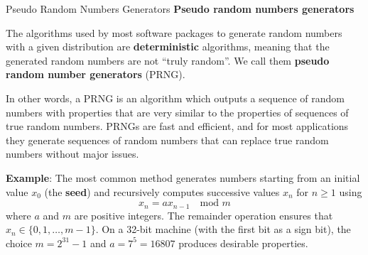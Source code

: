 \documentclass[8pt]{beamer}
\begin{document}
\begin{frame}{Pseudo Random Numbers Generators}
{\bf Pseudo random numbers generators}
\vspace{2mm}

The algorithms used by most software packages to generate random numbers with a given distribution are {\bf deterministic} algorithms, meaning that the generated random numbers are not ``truly random''. We call them {\bf pseudo random number generators} (PRNG).
\vspace{2mm}

In other words, a PRNG is an algorithm which outputs a sequence of random numbers with properties that are very similar to the properties of sequences of true random numbers. PRNGs are fast and efficient, and for most applications they generate sequences of random numbers that can replace true random numbers without major issues.  

\vspace{2mm}
\textbf{Example}: The most common method generates numbers starting from an initial value $x_0$ (the \textbf{seed}) and recursively computes successive values $x_n$ for $n \ge 1$ using
\begin{equation*}
	x_n = a x_{n-1} \quad \text{mod } m
\end{equation*}
where $a$ and $m$ are positive integers. The remainder operation ensures that $x_n \in \{0,1,\dots,m-1\}$. On a 32-bit machine (with the first bit as a sign bit), the choice $m = 2^{31}-1$ and $a = 7^5 = 16807$ produces desirable properties.
\end{frame}
\end{document}
